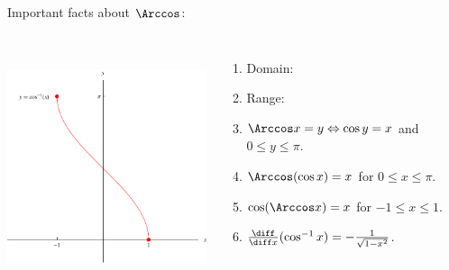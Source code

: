 \begin{frame}
Important facts about $\Arccos$:
\begin{columns}[c]
\ \includegraphics[height=6cm]{inverse-trig/pictures/07-06-arccosd.pdf}%
\begin{enumerate}
\item  \alert<handout:0| 2-3>{Domain: }
\item  \alert<handout:0| 4-5>{Range: }
\item  $\Arccos x = y \Leftrightarrow \cos y = x$ and $0 \leq y \leq \pi$.
\item  $\Arccos (\cos x) = x$ for $0 \leq x \leq \pi$.
\item  $\cos (\Arccos x) = x$ for $-1 \leq x \leq 1$.
\item  $\frac{\diff}{\diff x} (\cos^{-1} x) = -\frac{1}{\sqrt{1-x^2}}$.  
\end{enumerate}
\end{columns}
\end{frame}
